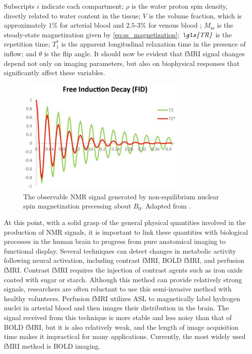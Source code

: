 Subscripts \( i \) indicate each compartment; \( \rho \) is the water proton spin density, directly related to water content in the tissue; \( V \) is the volume fraction, which is approximately \( 1\% \) for arterial blood \cite{Ito2001} and \( 2.5 \text{-} 3\% \) for venous blood \cite{An2002a, An2002b}; \( M_{\text{ss}} \) is the steady-state magnetization given by \autoref{eq:ss_magnetization}; \( \textit{\gls{TR}} \) is the repetition time; \( T_1^* \) is the apparent longitudinal relaxation time in the presence of inflow; and \( \theta \) is the \gls{flip angle}. It should now be evident that \gls{fMRI} signal changes depend not only on imaging parameters, but also on biophysical responses that significantly affect these variables.

\begin{figure}[htbp]
    \centering
    \includegraphics[width = 0.75\textwidth]{assets/images/FID.png}
    \caption[NMR Signal]{The observable \gls{NMR} signal generated by non-equilibrium nuclear spin magnetization precessing about $B_0$. Adapted from \cite{T2_star_graph}.}
    \label{fig:T2_star}
\end{figure}

At this point, with a solid grasp of the general physical quantities involved in the production of \gls{NMR} signals, it is important to link these quantities with biological processes in the human brain to progress from pure anatomical imaging to functional display. Several techniques can detect changes in metabolic activity following neural activation, including contrast \gls{fMRI}, \gls{BOLD} \gls{fMRI}, and perfusion \gls{fMRI}. Contrast \gls{fMRI} requires the injection of contrast agents such as iron oxide coated with sugar or starch. Although this method can provide relatively strong signals, researchers are often reluctant to use this semi-invasive method with healthy volunteers. Perfusion \gls{fMRI} utilizes \gls{ASL} to magnetically label hydrogen nuclei in arterial blood and then images their distribution in the brain. The signal received from this technique is more stable and less noisy than that of \gls{BOLD} \gls{fMRI}, but it is also relatively weak, and the length of image acquisition time makes it impractical for many applications. Currently, the most widely used \gls{fMRI} method is \gls{BOLD} imaging.

